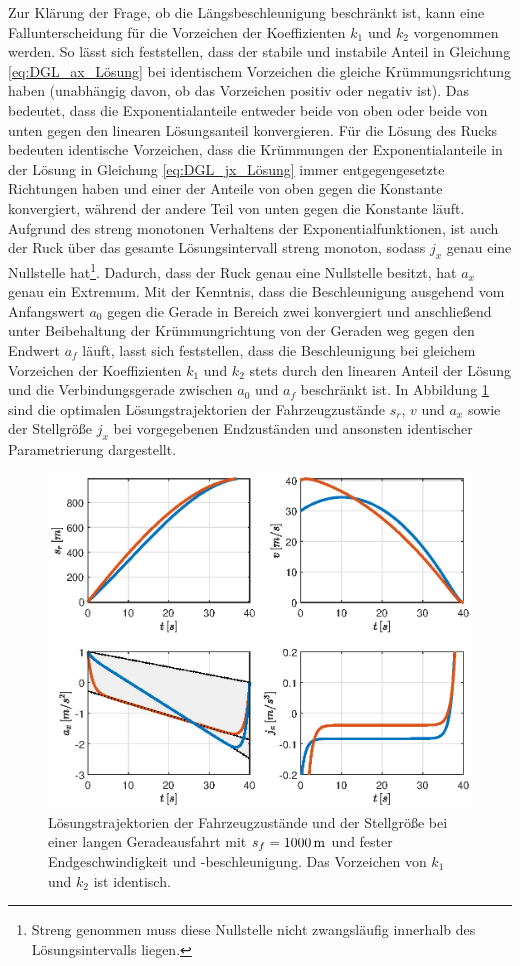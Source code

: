 Zur Klärung der Frage, ob die Längsbeschleunigung beschränkt ist, kann eine Fallunterscheidung für die Vorzeichen der Koeffizienten $k_1$ und $k_2$ vorgenommen werden. So lässt sich feststellen, dass der stabile und instabile Anteil in Gleichung \eqref{eq:DGL_ax_Lösung} bei identischem Vorzeichen die gleiche Krümmungsrichtung haben (unabhängig davon, ob das Vorzeichen positiv oder negativ ist). Das bedeutet, dass die Exponentialanteile entweder beide von oben oder beide von unten gegen den linearen Lösungsanteil konvergieren. Für die Lösung des Rucks bedeuten identische Vorzeichen, dass die Krümmungen der Exponentialanteile in der Lösung in Gleichung \eqref{eq:DGL_jx_Lösung} immer entgegengesetzte Richtungen haben und einer der Anteile von oben gegen die Konstante konvergiert, während der andere Teil von unten gegen die Konstante läuft. Aufgrund des streng monotonen Verhaltens der Exponentialfunktionen, ist auch der Ruck über das gesamte Lösungsintervall streng monoton, sodass $j_x$ genau eine Nullstelle hat\footnote{Streng genommen muss diese Nullstelle nicht zwangsläufig innerhalb des Lösungsintervalls liegen.}. Dadurch, dass der Ruck genau eine Nullstelle besitzt, hat $a_x$ genau ein Extremum. Mit der Kenntnis, dass die Beschleunigung ausgehend vom Anfangswert $a_0$ gegen die Gerade in Bereich zwei konvergiert und anschließend unter Beibehaltung der Krümmungrichtung von der Geraden weg gegen den Endwert $a_f$ läuft, lasst sich feststellen, dass die Beschleunigung bei gleichem Vorzeichen der Koeffizienten $k_1$ und $k_2$ stets durch den linearen Anteil der Lösung und die Verbindungsgerade zwischen $a_0$ und $a_f$ beschränkt ist. In Abbildung \ref{fig:vf_af_fest_gleiches_VZ} sind die optimalen Lösungstrajektorien der Fahrzeugzustände $s_r$, $v$ und $a_x$ sowie der Stellgröße $j_x$ bei vorgegebenen Endzuständen und ansonsten identischer Parametrierung dargestellt. 
\begin{figure}[h] 
	\centering
	\includegraphics[width=\linewidth]{./Bilder/Ergebnisse/Geradeausfahrt/vf_af_fest_gleiches_VZ.eps}
	\caption{Lösungstrajektorien der Fahrzeugzustände und der Stellgröße bei einer langen Geradeausfahrt mit $s_f=1000\,\mathrm{m}$ und fester Endgeschwindigkeit und -beschleunigung. Das Vorzeichen von $k_1$ und $k_2$ ist identisch.}
	\label{fig:vf_af_fest_gleiches_VZ}
\end{figure}
